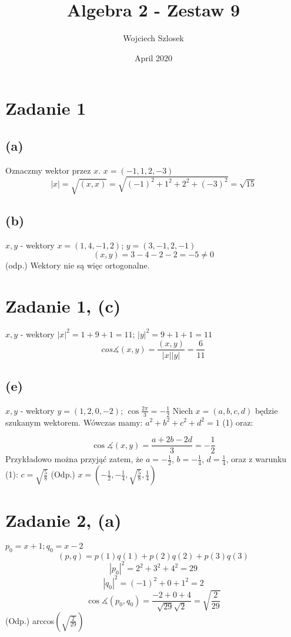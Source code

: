 \documentclass{article}
\title{Algebra 2 - Zestaw 9}
\author{Wojciech Szlosek}
\date{April 2020}
\begin{document}
\maketitle

\section{Zadanie 1}

\subsection{(a)}
Oznaczmy wektor przez $x$. \newline
$x = (-1,1,2,-3)$ \newline
$$|x| = \sqrt{(x,x)} = \sqrt{(-1)^{2} +1^{2}+2^{2}+(-3)^{2}} = \sqrt{15}$$

\subsection{(b)}

$x, y$ - wektory \newline
$x = (1,4,-1,2)$; $y = (3,-1,2,-1)$ 
$$(x,y) = 3-4-2-2 = -5 \neq 0$$
(odp.) Wektory nie są więc ortogonalne.

\section{Zadanie 1, (c)}
$x,y$ - wektory
$|x|^{2} = 1+9+1=11$; $|y|^{2}=9+1+1 = 11$ \newline
$$cos \measuredangle(x,y) = \frac{(x,y)}{|x||y|} = \frac{6}{11}$$

\subsection{(e)}
$x,y$ - wektory \newline
$y = (1,2,0,-2)$; $\cos{\frac{2\pi}{3}}= -\frac{1}{2}$ \newline
Niech $x = (a,b,c,d)$ będzie szukanym wektorem. Wówczas mamy: $a^2 +b^2 + c^2 + d^2 = 1$ (1) oraz:

$$\cos \measuredangle(x,y)= \frac{a+2b-2d}{3} = -\frac{1}{2}$$
Przykładowo można przyjąć zatem, że $a=-\frac{1}{2}$, $b=-\frac{1}{4}$, $d = \frac{1}{4}$, oraz z warunku (1): $c=\sqrt{\frac{5}{8}}$ \newline
(Odp.) $x = (-\frac{1}{2}, -\frac{1}{4}, \sqrt{\frac{5}{8}}, \frac{1}{4})$

\section{Zadanie 2, (a)}
$p_0 = x+1; q_0 = x-2$ \newline
$$(p,q)=p(1)q(1)+p(2)q(2)+p(3)q(3)$$
$$|p_0 |^2 = 2^2 +3^2 + 4^2 = 29$$
$$|q_0|^2 = (-1)^2 + 0 + 1^2 = 2$$
$$\cos \measuredangle (p_0, q_0) = \frac{-2+0+4}{\sqrt{29} \sqrt{2}} = \sqrt{\frac{2}{29}}$$
(Odp.) arccos$(\sqrt{\frac{2}{29}})$
\end{document}
